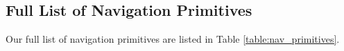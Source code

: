 \documentclass[letterpaper, 10 pt, conference]{ieeeconf}  %
\newcommand{\oier}[1]{\textcolor{purple}{Oier: #1}}
\begin{document}



\clearpage
\appendix
\normalsize


\subsection{Full List of Navigation Primitives}\label{sec:navigation-primitives}


Our full list of navigation primitives are listed in Table \ref{table:nav_primitives}.

\begin{table}[h]
  \centering
  \begin{tabularx}{0.45\textwidth}{l|X}
  \toprule


\end{tabularx}
\end{table}
\end{document}
